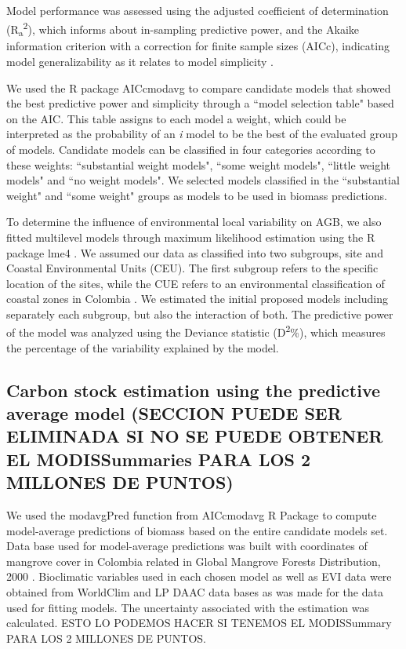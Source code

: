 \documentclass[review, authoryear]{elsarticle}   	%
\begin{document}
Model performance was assessed using the adjusted coefficient of determination (R\textsubscript{a}\textsuperscript{2}), which informs about in-sampling predictive power, and the Akaike information criterion with a correction for finite sample sizes (AICc), indicating model generalizability as it relates to model simplicity \citep{1748-9326-9-10-104013}.

We used the R package AICcmodavg \citep{Mazerolle:2015aa} to compare candidate models that showed the best predictive power and simplicity through a ``model selection table" based on the AIC. This table assigns to each model a weight, which could be interpreted as the probability of an  \emph{i} model to be the best of the evaluated group of models. %
Candidate models can be classified in four categories according to these weights: ``substantial weight models", ``some weight models", ``little weight models" and ``no weight models". We selected models classified in the ``substantial weight"  and ``some weight" groups as models to be used in biomass predictions.  

To determine the influence of environmental local variability on AGB, we also fitted multilevel models through maximum likelihood estimation using the R package lme4 \citep{Bates:2015aa}. We assumed our data as classified into two subgroups, site and Coastal Environmental Units (CEU). The first subgroup refers to the specific location of the sites, while the CUE refers to an environmental classification of coastal zones in Colombia \citep{CCO_UAC}. We estimated the initial proposed models including separately each subgroup, but also the interaction of both. The predictive power of the model was analyzed using the Deviance statistic (D\textsuperscript{2}\%), which measures the percentage of the variability explained by the model. 

\subsection {Carbon stock estimation using the predictive average model (SECCION PUEDE SER ELIMINADA SI NO SE PUEDE OBTENER EL MODISSummaries PARA LOS 2 MILLONES DE PUNTOS)}
We used the modavgPred function from AICcmodavg R Package to compute model-average predictions of biomass based on the entire candidate models set. Data base used for model-average predictions was built with coordinates of mangrove cover in Colombia related in Global Mangrove Forests Distribution, 2000 \citep{Giri2013, Giri2010}. Bioclimatic variables used in each chosen model as well as EVI data were obtained from WorldClim and LP DAAC data bases as was made for the data used for fitting models.  The uncertainty associated with the estimation was calculated. ESTO LO PODEMOS HACER SI TENEMOS EL MODISSummary PARA LOS 2 MILLONES DE PUNTOS.
\end{document}
